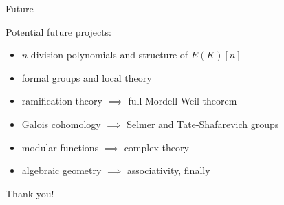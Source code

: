 \documentclass[10pt]{beamer}
\begin{document}
\begin{frame}{Future}

Potential future projects:
\begin{itemize}
\item $ n $-division polynomials and structure of $ E(K)[n] $
\item formal groups and local theory
\item ramification theory $ \implies $ full Mordell-Weil theorem
\item Galois cohomology $ \implies $ Selmer and Tate-Shafarevich groups
\item modular functions $ \implies $ complex theory
\item algebraic geometry $ \implies $ associativity, finally
\end{itemize}
Thank you!

\end{frame}
\end{document}
